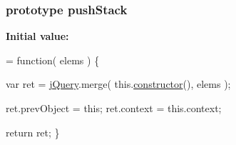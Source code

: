 \subsubsection[{push\+Stack}]{ {\bf prototype} push\+Stack}\label{jquery-1_810_82-vsdoc_8js_afc3a7db1ef2b526338c06c07cecccd44}
{\bfseries Initial value\+:}
\begin{DoxyCode}
= \textcolor{keyword}{function}( elems ) \{



        
        var ret = \hyperlink{jquery-1_810_82-vsdoc_8js_add5237586d970a38a81f990e8eb28c6c}{jQuery}.merge( this.\hyperlink{jquery-1_810_82-vsdoc_8js_ac8c7ab4467fc25f40e85c72221a1f10b}{constructor}(), elems );

        
        ret.prevObject = \textcolor{keyword}{this};
        ret.context = this.context;

        
        \textcolor{keywordflow}{return} ret;
    \}
\end{DoxyCode}
\hypertarget{jquery-1_810_82-vsdoc_8js_a4a4ce67ab280eb2cff0622a3bdc1f5b3}{}
